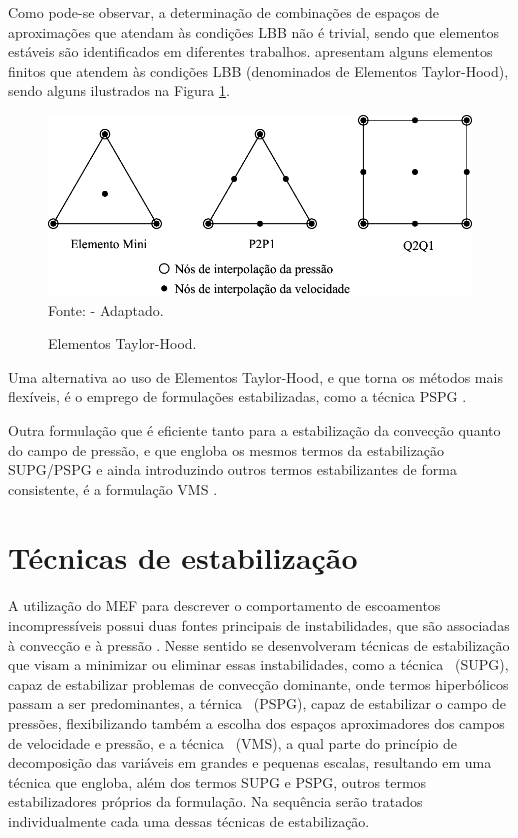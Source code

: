 Como pode-se observar, a determinação de combinações de espaços de aproximações que atendam às condições LBB não é trivial, sendo que elementos estáveis são identificados em diferentes trabalhos.  apresentam alguns elementos finitos que atendem às condições LBB (denominados de Elementos Taylor-Hood), sendo alguns ilustrados na Figura \ref{fig:Taylor-Hood}.

\begin{figure}[h!]
    \centering
    \caption{Elementos Taylor-Hood.}
    \includegraphics[width=.65\linewidth]{Figuras/Taylor-Hood.pdf}
    \\Fonte:  - Adaptado.
    \label{fig:Taylor-Hood}
\end{figure}

Uma alternativa ao uso de Elementos Taylor-Hood, e que torna os métodos mais flexíveis, é o emprego de formulações estabilizadas, como a técnica PSPG \cite{tezduyar1991stabilized}.

Outra formulação que é eficiente tanto para a estabilização da convecção quanto do campo de pressão, e que engloba os mesmos termos da estabilização SUPG/PSPG e ainda introduzindo outros termos estabilizantes de forma consistente, é a formulação VMS \cite{bazilevs2013computational}.

\section{Técnicas de estabilização}\label{STAB}

A utilização do MEF para descrever o comportamento de escoamentos incompressíveis possui duas fontes principais de instabilidades, que são associadas à convecção e à pressão \cite{tezduyar1991stabilized}. Nesse sentido se desenvolveram técnicas de estabilização que visam a minimizar ou eliminar essas instabilidades, como a técnica \SUPG\ (SUPG), capaz de estabilizar problemas de convecção dominante, onde termos hiperbólicos passam a ser predominantes, a térnica \PSPG\ (PSPG), capaz de estabilizar o campo de pressões, flexibilizando também a escolha dos espaços aproximadores dos campos de velocidade e pressão, e a técnica \VMS\ (VMS), a qual parte do princípio de decomposição das variáveis em grandes e pequenas escalas, resultando em uma técnica que engloba, além dos termos SUPG e PSPG, outros termos estabilizadores próprios da formulação. Na sequência serão tratados individualmente cada uma dessas técnicas de estabilização.


